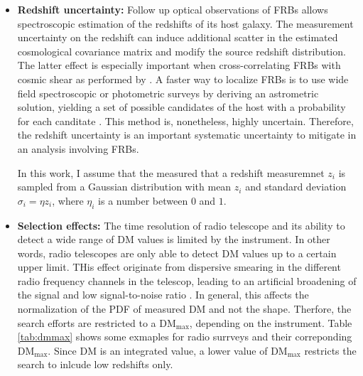 \begin{itemize}
In this work, I assume that the host contribution follows a lognormal distribution since it fits the analytical prediction from  \citet{reischke2024analytical} and the simulation results from \citet{theis2024galaxy} for a sample size of $10^4$ FRBs, which what we consider in this thesis. In general, if the lognormal distribution is parameterized by $\mu$ and $\sigma_\mathrm{LN}^2$, then the probability distribution funciton of the host contribution is given as
\begin{equation}
P_{\mathrm{host}}(\mathrm{DM}_\mathrm{host};\mu,\sigma_{\mathrm{LN}}) = \frac{1}{\mathrm{DM}_\mathrm{host}\sigma_{\mathrm{LN}}\sqrt{2\pi}} \exp\left(-\frac{(\ln \mathrm{DM}_\mathrm{host} - \mu)^2}{2\sigma_{\mathrm{LN}}^2}\right),
\end{equation}
where $\exp(\mu)$ and $\exp(2\mu + \sigma_{\mathrm{LN}}^2)\left[\exp(\sigma_{\mathrm{LN}}^2) - 1\right]$ are the median and the variance of the distribution. 

\item \textbf{Redshift uncertainty:} Follow up optical observations of FRBs allows spectroscopic estimation of the redshifts of its host galaxy. The measurement uncertainty on the redshift can induce additional scatter in the estimated cosmological covariance matrix and modify the source redshift distribution. The latter effect is especially important when cross-correlating FRBs with cosmic shear as performed by \citet{reischke2023calibrating}. A faster way to localize FRBs is to use wide field spectroscopic or photometric surveys by deriving an astrometric solution, yielding a set of possible candidates of the host with a probability for each canditate \citep{garcia2025search}. This method is, nonetheless, highly uncertain. Therefore, the redshift uncertainty is an important systematic uncertainty to mitigate in an analysis involving FRBs.

In this work, I assume that the measured that a redshift measuremnet $z_i$ is sampled from a Gaussian distribution with mean $z_i$ and standard deviation $\sigma_i = \eta z_i$, where $\eta_i$ is a number between $0$ and $1$.


\item \textbf{Selection effects:} The time resolution of radio telescope and its ability to detect a wide range of DM values is limited by the instrument. In other words, radio telescopes are only able to detect DM values up to a certain upper limit. THis effect originate from dispersive smearing in the different radio frequency channels in the telescop, leading to an artificial broadening of the signal and low signal-to-noise ratio \citep{hoffmann2025modelling}. In general, this affects the normalization of the PDF of measured DM and not the shape. Therfore, the search efforts are restricted to a $\mathrm{DM}_\mathrm{\max}$, depending on the instrument. Table \ref{tab:dmmax} shows some exmaples for radio surrveys and their correponding $\mathrm{DM}_\mathrm{\max}$. Since $\mathrm{DM}$ is an integrated value, a lower value of $\mathrm{DM}_\mathrm{\max}$ restricts the search to inlcude low redshifts only. 


\end{itemize}
